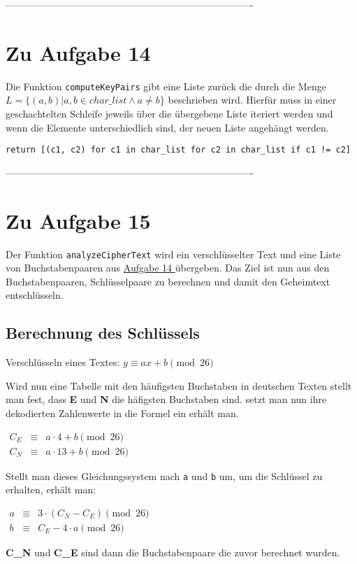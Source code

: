 \documentclass[12pt]{article}
\begin{document}
 
%
 ----------------------------------------------------------------------------
\section{Zu Aufgabe 14}

Die Funktion \texttt{computeKeyPairs} gibt eine Liste zurück die durch die Menge $L =\{(a,b) \vert a, b \in char\_list \land a \neq b\}$ beschrieben wird. Hierfür muss in einer geschachtelten Schleife jeweils über die übergebene Liste iteriert werden und wenn die Elemente unterschiedlich sind, der neuen Liste angehängt werden.

\begin{lstlisting}
return [(c1, c2) for c1 in char_list for c2 in char_list if c1 != c2]
\end{lstlisting}

%
 ----------------------------------------------------------------------------
\section{Zu Aufgabe 15}

Der Funktion \texttt{analyzeCipherText} wird ein verschlüsselter Text und eine Liste von Buchstabenpaaren aus \hyperref[sec:aufgabe_14]{Aufgabe 14 } übergeben. Das Ziel ist nun aus den Buchstabenpaaren, Schlüsselpaare zu berechnen und damit den Geheimtext entschlüsseln.

\subsection{Berechnung des Schlüssels}

Verschlüsseln eines Textes:
$y \equiv ax + b \pmod{26}$

Wird nun eine Tabelle mit den häufigsten Buchstaben in deutschen Texten stellt man fest, dass \textbf{E} und \textbf{N} die häfigsten Buchstaben sind. setzt man nun ihre dekodierten Zahlenwerte in die Formel ein erhält man.

$
\begin{array}{lcl} 
C_E & \equiv & a \cdot 4 + b \pmod{26}\\
C_N & \equiv & a \cdot 13 + b \pmod{26} \end{array}
$

Stellt man dieses Gleichungssystem nach \texttt{a} und \texttt{b} um, um die Schlüssel zu erhalten, erhält man:

$
\begin{array}{lcl} 
a & \equiv & 3 \cdot (C_N - C_E) \pmod{26}\\
b & \equiv & C_E - 4 \cdot a \pmod{26} \end{array}
$

\textbf{C_N} und \textbf{C_E} sind dann die Buchstabenpaare die zuvor berechnet wurden. 
\end{document}
